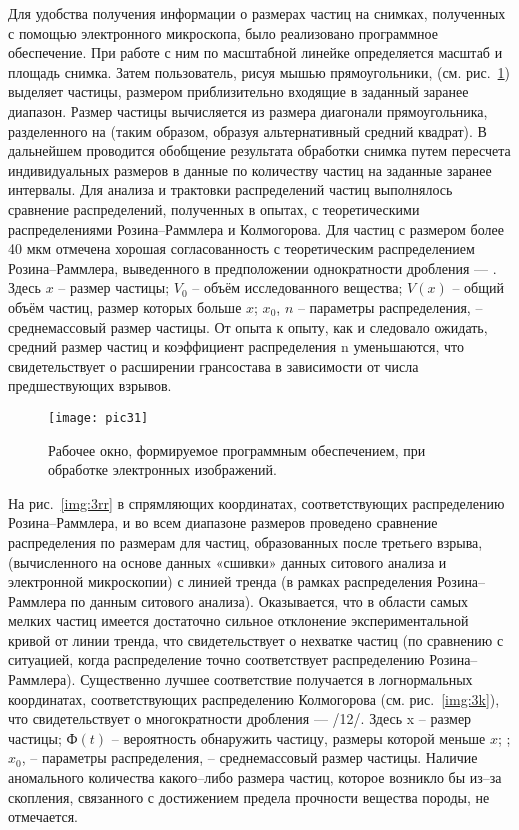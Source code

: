 Для удобства получения информации о размерах частиц на снимках, полученных с помощью электронного микроскопа, было реализовано программное обеспечение. При работе с ним по масштабной линейке определяется масштаб и площадь снимка. Затем пользователь, рисуя мышью прямоугольники, (см. рис.~\ref{img:3app}) выделяет частицы, размером приблизительно входящие в заданный заранее диапазон. Размер частицы вычисляется из размера диагонали прямоугольника, разделенного на (таким образом, образуя альтернативный средний квадрат). В дальнейшем проводится обобщение результата обработки снимка путем пересчета индивидуальных размеров в данные по количеству частиц на заданные заранее интервалы.
Для анализа и трактовки распределений частиц выполнялось сравнение распределений, полученных в опытах, с теоретическими распределениями Розина–Раммлера и Колмогорова. Для частиц с размером более 40 мкм отмечена хорошая согласованность с теоретическим распределением Розина–Раммлера, выведенного в предположении однократности дробления —  . Здесь $x$ – размер частицы; $V_{0}$ – объём исследованного вещества; $V(x)$ – общий объём частиц, размер которых больше $x$; $x_{0}$, $n$ – параметры распределения,   – среднемассовый размер частицы. От опыта к опыту, как и следовало ожидать, средний размер частиц и коэффициент распределения n уменьшаются, что свидетельствует о расширении грансостава в зависимости от числа предшествующих взрывов. 

\begin{figure} [h] 
  \center
  \texttt{[image: pic31]}
  \caption{Рабочее окно, формируемое программным обеспечением, при обработке электронных изображений.} 
  \label{img:3app}  
\end{figure}

На рис.~\ref{img:3rr} в спрямляющих координатах, соответствующих распределению Розина–Раммлера, и во всем диапазоне размеров проведено сравнение распределения по размерам для частиц, образованных после третьего взрыва, (вычисленного на основе данных «сшивки» данных ситового анализа и электронной микроскопии) с линией тренда (в рамках распределения Розина–Раммлера по данным ситового анализа). Оказывается, что в области самых мелких частиц имеется достаточно сильное отклонение экспериментальной кривой от линии тренда, что свидетельствует о нехватке частиц (по сравнению с ситуацией, когда распределение точно соответствует распределению Розина–Раммлера).
Существенно лучшее соответствие получается в логнормальных координатах, соответствующих распределению Колмогорова (см. рис.~\ref{img:3k}), что свидетельствует о многократности дробления —   /12/. Здесь x – размер частицы; $Ф(t)$ – вероятность обнаружить частицу, размеры которой меньше $x$; ; $x_{0}$,   – параметры распределения,   – среднемассовый размер частицы. Наличие аномального количества какого–либо размера частиц, которое возникло бы из–за скопления, связанного с достижением предела прочности вещества породы, не отмечается.

